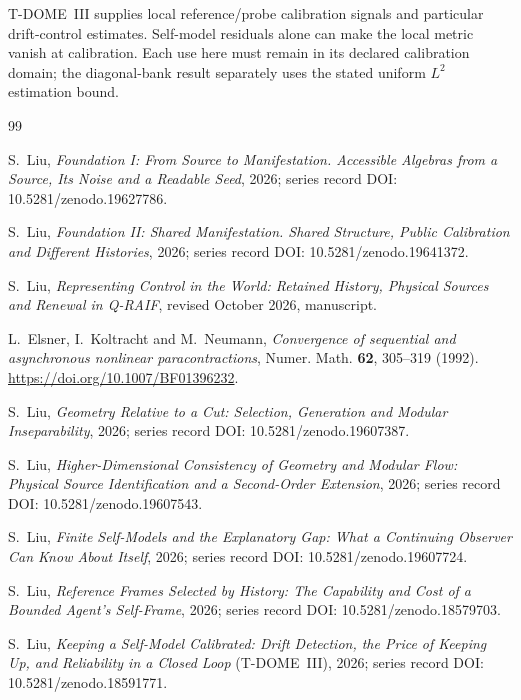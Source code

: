 \documentclass[12pt]{article}
\theoremstyle{definition}
\theoremstyle{remark}
\begin{document}
T-DOME~III supplies local reference/probe calibration signals and
particular drift-control estimates. Self-model residuals alone can
make the local metric vanish at calibration. Each use here must remain
in its declared calibration domain; the diagonal-bank result separately
uses the stated uniform $L^2$ estimation bound.

\newpage
{}

\begin{thebibliography}{99}
\small
\sloppy

S.~Liu, \emph{Foundation I: From Source to Manifestation.
Accessible Algebras from a Source, Its Noise and a Readable Seed},
2026; series record DOI: 10.5281/zenodo.19627786.

S.~Liu, \emph{Foundation II: Shared Manifestation.
Shared Structure, Public Calibration and Different Histories},
2026; series record DOI: 10.5281/zenodo.19641372.

S.~Liu, \emph{Representing Control in the World: Retained History, Physical Sources and Renewal in Q-RAIF},
revised October 2026, manuscript.

L.~Elsner, I.~Koltracht and M.~Neumann,
\emph{Convergence of sequential and asynchronous nonlinear paracontractions},
Numer. Math. \textbf{62}, 305--319 (1992).
\url{https://doi.org/10.1007/BF01396232}.

S.~Liu, \emph{Geometry Relative to a Cut: Selection, Generation and Modular Inseparability}, 2026;
series record DOI: 10.5281/zenodo.19607387.

S.~Liu, \emph{Higher-Dimensional Consistency of Geometry and Modular Flow: Physical Source Identification and a Second-Order Extension},
2026; series record DOI: 10.5281/zenodo.19607543.

S.~Liu, \emph{Finite Self-Models and the Explanatory Gap:
What a Continuing Observer Can Know About Itself}, 2026; series record DOI: 10.5281/zenodo.19607724.

S.~Liu, \emph{Reference Frames Selected by History:
The Capability and Cost of a Bounded Agent's Self-Frame},
2026; series record DOI: 10.5281/zenodo.18579703.

S.~Liu, \emph{Keeping a Self-Model Calibrated: Drift Detection,
the Price of Keeping Up, and Reliability in a Closed Loop}
(T-DOME~III), 2026;
series record DOI: 10.5281/zenodo.18591771.


\end{thebibliography}
\end{document}
